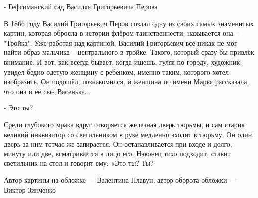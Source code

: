 - Гефсиманский сад Василия Григорьевича Перова

В 1866 году Василий Григорьевич Перов создал одну из своих самых знаменитых
картин, которая обросла в истории флёром таинственности, называется она –
"Тройка". Уже работая над картиной, Василий Григорьевич всё никак не мог найти
образ мальчика – центрального в тройке. Такого, который сразу бы привлёк
внимание. И вот, как всегда бывает, когда ищешь, гуляя по городу, художник
увидел бедно одетую женщину с ребёнком, именно таким, которого хотел
изобразить. Он подошёл, познакомился, и женщина по имени Марья рассказала, что
она и её сын Васенька...

- Это ты?

Среди глубокого мрака вдруг отворяется железная дверь тюрьмы, и сам старик
великий инквизитор со светильником в руке медленно входит в тюрьму. Он один,
дверь за ним тотчас же запирается. Он останавливается при входе и долго, минуту
или две, всматривается в лицо его. Наконец тихо подходит, ставит светильник на
стол и говорит ему: «Это ты? Ты?

Автор картины на обложке — Валентина Плавун, автор оборота обложки — Виктор
Зинченко
